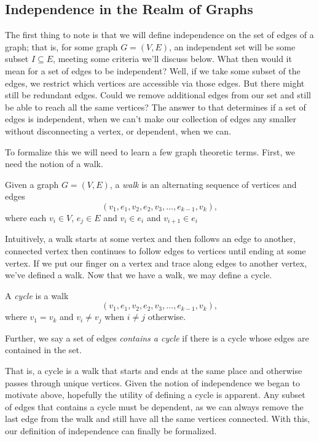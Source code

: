 \documentclass[12pt,oneside]{../../sfsuthesis}
\begin{document}
\subsection{Independence in the Realm of Graphs}

The first thing to note is that we will define independence on the set of edges of a graph;
that is, for some graph \( G = (V, E) \), an independent set will be some subset \( I \subseteq E \), meeting some criteria we'll discuss below.
What then would it mean for a set of edges to be independent?
Well, if we take some subset of the edges, we restrict which vertices are accessible via those edges.
But there might still be redundant edges.
Could we remove additional edges from our set and still be able to reach all the same vertices?
The answer to that determines if a set of edges is independent, when we can't make our collection of edges any smaller without disconnecting a vertex, or dependent, when we can.

To formalize this we will need to learn a few graph theoretic terms.
First, we need the notion of a walk.
\begin{definition}[Walk]
    Given a graph \( G = (V, E) \), a \emph{walk} is an alternating sequence of vertices and edges
    \[
        (v_1, e_1, v_2, e_2, v_3, \ldots, e_{k-1}, v_k),
    \]
    where each \( v_i \in V \), \( e_j \in E \) and \( v_i \in e_i \) and \( v_{i+1} \in e_i \)
\end{definition}
Intuitively, a walk starts at some vertex and then follows an edge to another, connected vertex then continues to follow edges to vertices until ending at some vertex.
If we put our finger on a vertex and trace along edges to another vertex, we've defined a walk.
Now that we have a walk, we may define a cycle.
\begin{definition}[Cycle]
    A \emph{cycle} is a walk
    \[
        (v_1, e_1, v_2, e_2, v_3, \ldots, e_{k-1}, v_k),
    \]
    where \( v_1 = v_k \) and \( v_i \neq v_j \) when \( i \neq j \) otherwise.

    Further, we say a set of edges \emph{contains a cycle} if there is a cycle whose edges are contained in the set.
\end{definition}
That is, a cycle is a walk that starts and ends at the same place and otherwise passes through unique vertices.
Given the notion of independence we began to motivate above, hopefully the utility of defining a cycle is apparent.
Any subset of edges that contains a cycle must be dependent, as we can always remove the last edge from the walk and still have all the same vertices connected.
With this, our definition of independence can finally be formalized.
\end{document}
